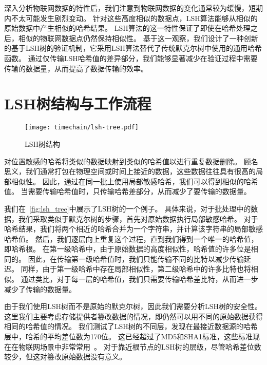 深入分析物联网数据的特性后，我们注意到物联网数据的变化通常较为缓慢，短期内不太可能发生剧烈变动。
针对这些高度相似的数据点，LSH算法能够从相似的原始数据中产生相似的哈希结果。
LSH算法的这一特性保证了即使在哈希处理之后，相似的物联网数据点仍然保持相似性。
基于这一观察，我们设计了一种创新的基于LSH树的验证机制，它采用LSH算法替代了传统默克尔树中使用的通用哈希函数。
通过仅传输LSH哈希值的差异部分，我们能够显著减少在验证过程中需要传输的数据量，从而提高了数据传输的效率。

\section{LSH树结构与工作流程}

\begin{figure}[t]
    \centering
	\begin{minipage}{0.45\linewidth}
        \centering
        \texttt{[image: timechain/lsh-tree.pdf]}
        \caption{LSH树结构}
        \label{fig:lsh_tree}
	\end{minipage}
\end{figure}

对位置敏感的哈希将类似的数据映射到类似的哈希值以进行重复数据删除。
顾名思义，我们通常打包在物理空间或时间上接近的数据，这些数据往往具有很高的局部相似性。
因此，通过在同一批上使用局部敏感哈希，我们可以得到相似的哈希值。
当需要传输哈希值时，只传输哈希差部分，从而减少了要传输的数据量。

我们在~\autoref{fig:lsh_tree}中展示了LSH树的一个例子。
具体来说，对于批处理中的数据，我们采取类似于默克尔树的步骤，首先对原始数据执行局部敏感哈希。
对于哈希结果，我们将两个相近的哈希合并为一个字符串，并计算该字符串的局部敏感哈希值。
然后，我们逐层向上重复这个过程，直到我们得到一个唯一的哈希值，即哈希根。
在第一级哈希中，由于原始数据的高度相似性，哈希值的许多位是相同的。
因此，在传输第一级哈希值时，我们只能传输不同的比特以减少传输延迟。
同样，由于第一级哈希中存在局部相似性，第二级哈希中的许多比特也将相似。
通过类比，对于每一层的哈希值，我们只需要传输哈希差比特，从而进一步减少了传输的数据量。

由于我们使用LSH树而不是原始的默克尔树，因此我们需要分析LSH树的安全性。
这里我们主要考虑存储提供者篡改数据的情况，即仍然可以用不同的原始数据获得相同的哈希值的情况。
我们测试了LSH树的不同层，发现在最接近数据源的哈希层中，哈希的平均差位数为170位。
这已经超过了MD5和SHA1标准，这些标准现在在物联网场景中非常常用~\cite{chi2017hashing,landge2018secured}。
对于靠近根节点的LSH树的层级，尽管哈希差位数较少，但这对篡改原始数据没有意义。

